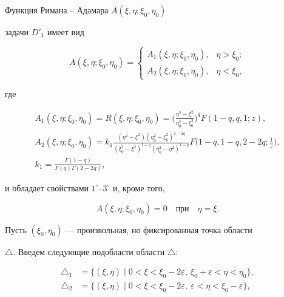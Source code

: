 Функция Римана -- Адамара $A(\xi,\eta;\xi_0,\eta_0)$


задачи $D'_1$ имеет вид


$$


A(\xi,\eta;\xi_0,\eta_0)=


\begin{cases}


A_1(\xi,\eta;\xi_0,\eta_0), & \eta>\xi_0; \\


A_2(\xi,\eta;\xi_0,\eta_0), & \eta<\xi_0, 


\end{cases}


$$


где


\begin{gather*}


A_1(\xi,\eta;\xi_0,\eta_0)=R(\xi,\eta;\xi_0,\eta_0)=


\bigg( \frac{\eta^2-\xi^2}{\eta_0^2-\xi_0^2}


\bigg)^q F(1-q,q,1;z),\\


%


A_2(\xi,\eta;\xi_0,\eta_0)=k_1 


\displaystyle {\frac{(\eta^2-\xi^2)(\eta_0^2-\xi_0^2)^{1-2q}}


{(\xi_0^2-\xi^2)^{1-q} (\eta_0^2-\eta^2)^{1-q}}}


F\bigg(1-q,1-q,2-2q;\frac{1}{z}\bigg), \\


%


k_1=\frac{\Gamma(1-q)}{\Gamma(q)\Gamma(2-2q)},


\end{gather*}


и обладает свойствами $1^\circ$--$3^\circ$ и, кроме того, 


$$


A(\xi,\eta;\xi_0,\eta_0)=0 \quad \text{при} \quad  \eta=\xi.


$$





Пусть $(\xi_0,\eta_0)$ --- произвольная, но фиксированная точка области


$\triangle$. Введем следующие подобласти области $\triangle$:


\begin{align*}


\triangle_1&=\{ (\xi,\eta)\mid  0<\xi<\xi_0-2\varepsilon, 


\ \xi_0+\varepsilon<\eta<\eta_0 \},\\


%


\triangle_2&=\{ (\xi,\eta) \mid 0<\xi<\xi_0-2\varepsilon, 


\ \varepsilon<\eta<\xi_0-\varepsilon \},


\end{align*}


